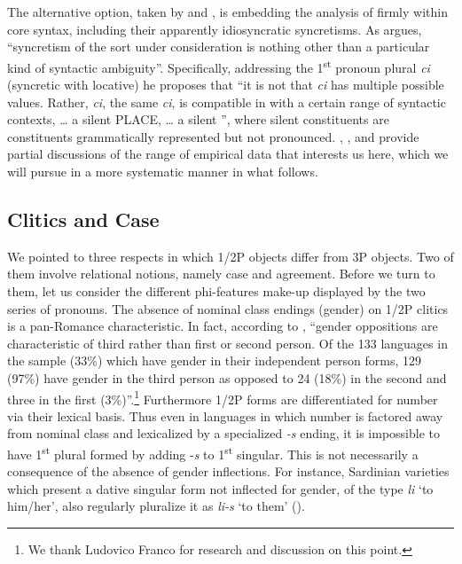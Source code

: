 \documentclass[output=paper]{langsci/langscibook}
\begin{document}
The alternative option, taken by \citet{ManziniSavoia2005} and \citet{Kayne2010},
is embedding the analysis of  firmly within core syntax, including their
apparently idiosyncratic syncretisms. As \citet[144]{Kayne2010} argues,
“syncretism of the sort under consideration is nothing other than a particular
kind of syntactic ambiguity”. Specifically, addressing the
1\textsuperscript{st} pronoun plural \emph{ci} (syncretic with locative) he
proposes that “it is not that \emph{ci} has multiple possible values. Rather,
\emph{ci}, the same \emph{ci}, is compatible in  with a certain range of
syntactic contexts, … a silent PLACE, … a silent \Fpl{}”, where silent
constituents are constituents grammatically represented but not pronounced.
\citet{ManziniSavoia2005}, \citet{Manzini2012}, and \citet{ManFra2016}
provide partial discussions of the range of empirical data that interests us
here, which we will pursue in a more systematic manner in what follows.

\subsection{Clitics and Case}\label{sec:06.1.1}

We pointed to three respects in which 1/2P objects differ from 3P objects. Two
of them involve relational notions, namely case and agreement. Before we turn
to them, let us consider the different phi-features make-up displayed by the
two series of pronouns. The absence of nominal class endings (gender) on 1/2P
clitics is a pan-Romance characteristic. In fact, according to
\citet[194]{Siewierska2004}, “gender oppositions are characteristic of third
rather than first or second person. Of the 133 languages in the sample (33\%)
which have gender in their independent person forms, 129 (97\%) have gender in
the third person as opposed to 24 (18\%) in the second and three in the first
(3\%)”.\footnote{We thank Ludovico Franco for research and discussion
on this point.} Furthermore 1/2P forms are differentiated for number via
their lexical basis. Thus even in  languages in which number is factored
away from nominal class and lexicalized by a specialized \emph{-s} ending, it
is impossible to have 1\textsuperscript{st} plural formed by adding -\emph{s}
to 1\textsuperscript{st} singular. This is not necessarily a consequence of the
absence of gender inflections. For instance, Sardinian varieties which present
a dative singular form not inflected for gender, of the type
\emph{li} ‘to him/her’, also regularly pluralize it as \emph{li-s} ‘to them’
(\citealt{ManziniSavoia2005}).
\end{document}
